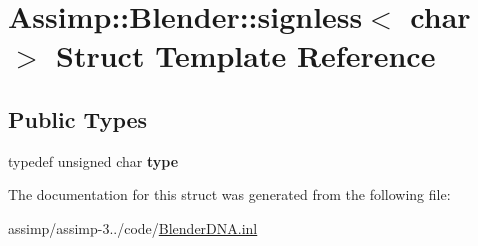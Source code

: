 \hypertarget{struct_assimp_1_1_blender_1_1signless_3_01char_01_4}{\section{Assimp\+:\+:Blender\+:\+:signless$<$ char $>$ Struct Template Reference}
\label{struct_assimp_1_1_blender_1_1signless_3_01char_01_4}
}
\subsection*{Public Types}
\begin{DoxyCompactItemize}
\item 
\hypertarget{struct_assimp_1_1_blender_1_1signless_3_01char_01_4_aca21a157786b3f3261a0ff51d64efcd2}{typedef unsigned char {\bfseries type}}\label{struct_assimp_1_1_blender_1_1signless_3_01char_01_4_aca21a157786b3f3261a0ff51d64efcd2}

\end{DoxyCompactItemize}


The documentation for this struct was generated from the following file\+:\begin{DoxyCompactItemize}
\item 
assimp/assimp-\/3../code/\hyperlink{_blender_d_n_a_8inl}{Blender\+D\+N\+A.\+inl}\end{DoxyCompactItemize}
